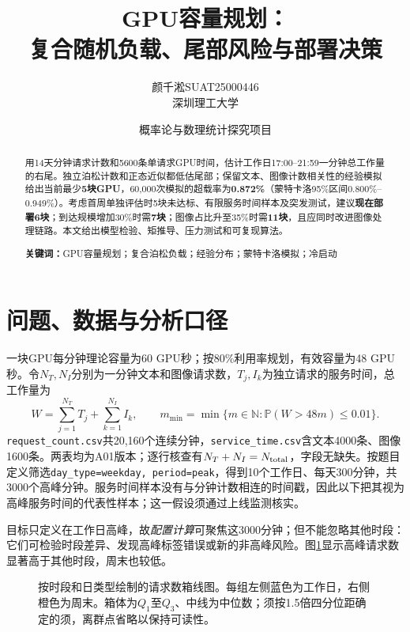 \documentclass[UTF8,a4paper,11pt,fontset=fandol]{ctexart}
\title{\bfseries GPU容量规划：\\[.3em]复合随机负载、尾部风险与部署决策}
\author{颜千淞\quad SUAT25000446\\[.3em]\small 深圳理工大学}
\date{\small 概率论与数理统计探究项目}
\numberwithin{equation}{section}
\newcommand{\pr}{\mathbb{P}}
\begin{document}
\maketitle
\begin{abstract}
用14天分钟请求计数和5600条单请求GPU时间，估计工作日17:00--21:59一分钟总工作量的右尾。独立泊松计数和正态近似都低估尾部；保留文本、图像计数相关性的经验模拟给出当前最少\textbf{5块GPU}，60,000次模拟的超载率为\textbf{0.872\%}（蒙特卡洛95\%区间0.800\%--0.949\%）。考虑首周单独评估时5块未达标、有限服务时间样本及突发测试，建议\textbf{现在部署6块}；到达规模增加30\%时需\textbf{7块}；图像占比升至35\%时需\textbf{11块}，且应同时改进图像处理链路。本文给出模型检验、矩推导、压力测试和可复现算法。
\par\vspace{.5em}\noindent\textbf{关键词：}GPU容量规划；复合泊松负载；经验分布；蒙特卡洛模拟；冷启动
\end{abstract}
\clearpage
\tableofcontents
\clearpage

\section{问题、数据与分析口径}
一块GPU每分钟理论容量为60 GPU秒；按80\%利用率规划，有效容量为48 GPU秒。令$N_T,N_I$分别为一分钟文本和图像请求数，$T_j,I_k$为独立请求的服务时间，总工作量为
\begin{equation}
W=\sum_{j=1}^{N_T}T_j+\sum_{k=1}^{N_I}I_k,\qquad
m_{\min}=\min\{m\in\mathbb N:\pr(W>48m)\leq0.01\}.
\label{eq:target}
\end{equation}
\texttt{request\_count.csv}共20,160个连续分钟，\texttt{service\_time.csv}含文本4000条、图像1600条。两表均为A01版本；逐行核查有$N_T+N_I=N_{\rm total}$，字段无缺失。按题目定义筛选\texttt{day\_type=weekday, period=peak}，得到10个工作日、每天300分钟，共3000个高峰分钟。服务时间样本没有与分钟计数相连的时间戳，因此以下把其视为高峰服务时间的代表性样本；这一假设须通过上线监测核实。

目标只定义在工作日高峰，故\emph{配置计算}可聚焦这3000分钟；但不能忽略其他时段：它们可检验时段差异、发现高峰标签错误或新的非高峰风险。图\ref{fig:boxes}显示高峰请求数显著高于其他时段，周末也较低。

\begin{figure}[htbp]
\centering

\caption{按时段和日类型绘制的请求数箱线图。每组左侧蓝色为工作日，右侧橙色为周末。箱体为$Q_1$至$Q_3$、中线为中位数；须按1.5倍四分位距确定的须，离群点省略以保持可读性。}
\label{fig:boxes}
\end{figure}
\end{document}
